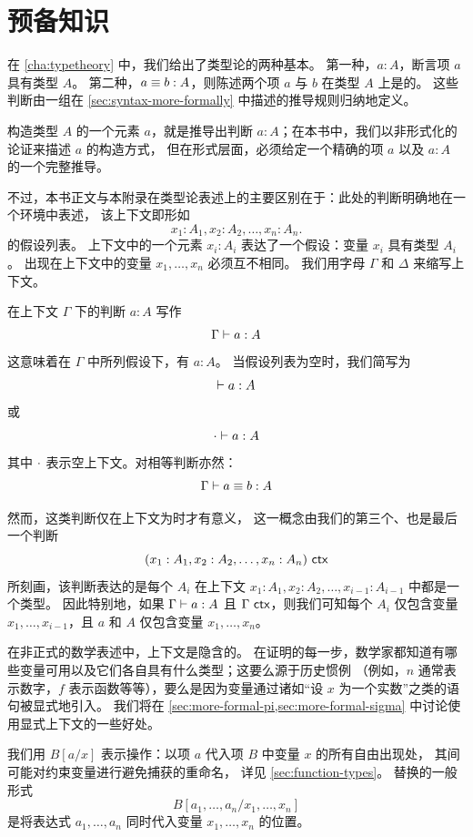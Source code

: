 \section*{预备知识}
\label{sec:formal-prelim}

在 \cref{cha:typetheory} 中，我们给出了类型论的两种基本。
第一种，$a:A$，断言项 $a$ 具有类型 $A$。
第二种，$a\equiv b:A$，则陈述两个项 $a$ 与 $b$ 在类型 $A$ 上是的。%
这些判断由一组在 \cref{sec:syntax-more-formally} 中描述的推导规则归纳地定义。

构造类型 $A$ 的一个元素 $a$，就是推导出判断 $a:A$；在本书中，我们以非形式化的论证来描述 $a$ 的构造方式，
但在形式层面，必须给定一个精确的项 $a$ 以及 $a:A$ 的一个完整推导。

不过，本书正文与本附录在类型论表述上的主要区别在于：此处的判断明确地在一个环境中表述，
该上下文即形如
\[
  x_1:A_1, x_2:A_2,\dots,x_n:A_n.
\]
的假设列表。
上下文中的一个元素 $x_i : A_i$ 表达了一个假设：变量 $x_i$ 具有类型 $A_i$。
出现在上下文中的变量 $x_1, \ldots, x_n$ 必须互不相同。
我们用字母 $\Gamma$ 和 $\Delta$ 来缩写上下文。

在上下文 $\Gamma$ 下的判断 $a:A$ 写作
\[ \Gamma \vdash a : A \]
这意味着在 $\Gamma$ 中所列假设下，有 $a:A$。
当假设列表为空时，我们简写为
\[ \vdash a : A \]
或
\[ \cdot \vdash a : A \]
其中 $\cdot$ 表示空上下文。对相等判断亦然：
\[
  \Gamma \vdash a \equiv b : A
\]

然而，这类判断仅在上下文为时才有意义，
%
这一概念由我们的第三个、也是最后一个判断\[
  (x_1:A_1, x_2:A_2,\dots,x_n:A_n)\ \mathsf{ctx}
\]所刻画，该判断表达的是每个 $A_i$ 在上下文 $x_1:A_1,
x_2:A_2,\dots,x_{i-1}:A_{i-1}$ 中都是一个类型。
因此特别地，如果 $\Gamma \vdash a : A$ 且 $\Gamma\ \mathsf{ctx}$，则我们可知每个 $A_i$ 仅包含变量
$x_1,\dots,x_{i-1}$，且 $a$ 和 $A$ 仅包含变量
$x_1,\dots,x_n$。

在非正式的数学表述中，上下文是隐含的。
在证明的每一步，数学家都知道有哪些变量可用以及它们各自具有什么类型；这要么源于历史惯例
（例如，$n$ 通常表示数字，$f$ 表示函数等等），要么是因为变量通过诸如``设 $x$ 为一个实数''之类的语句被显式地引入。
我们将在 \cref{sec:more-formal-pi,sec:more-formal-sigma} 中讨论使用显式上下文的一些好处。

我们用 $B[a/x]$ 表示操作：以项 $a$ 代入项 $B$ 中变量 $x$ 的所有自由出现处，
%
其间可能对约束变量进行避免捕获的重命名，
%
详见 \cref{sec:function-types}。
替换的一般形式
%
\[
   B[a_1,\dots,a_n/x_1,\dots,x_n]
\]
%
是将表达式 $a_1,\dots,a_n$ 同时代入变量 $x_1,\dots,x_n$ 的位置。

